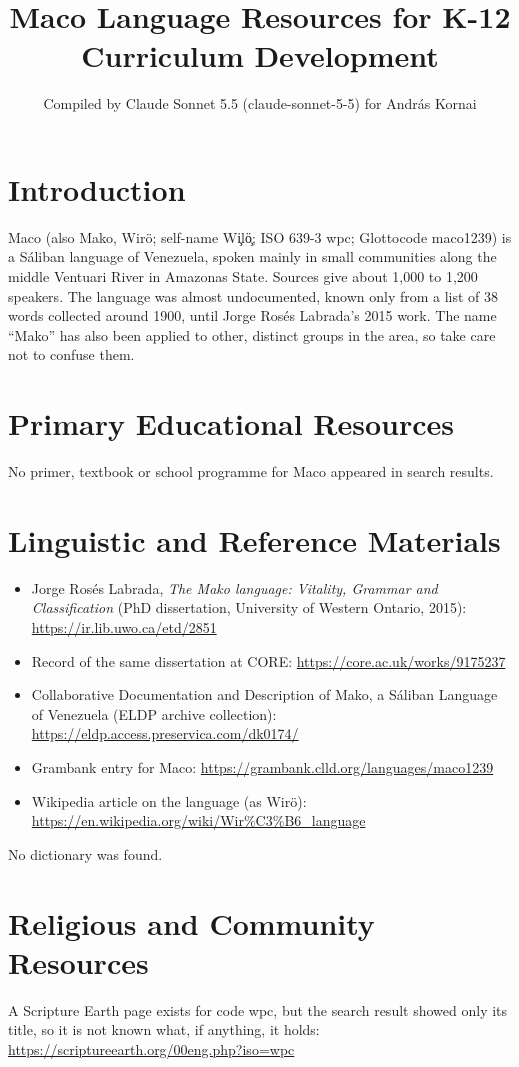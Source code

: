 \documentclass[12pt]{article}
\title{Maco Language Resources for K-12 Curriculum Development}
\author{Compiled by Claude Sonnet 5.5 (claude-sonnet-5-5) for Andr\'as Kornai}
\date{}
\begin{document}
\maketitle

\section{Introduction}
Maco (also Mako, Wir\"o; self-name Wi\c{}l\"o\c{}; ISO 639-3 wpc; Glottocode maco1239) is a S\'aliban language of Venezuela, spoken mainly in small communities along the middle Ventuari River in Amazonas State. Sources give about 1,000 to 1,200 speakers. The language was almost undocumented, known only from a list of 38 words collected around 1900, until Jorge Ros\'es Labrada's 2015 work. The name ``Mako'' has also been applied to other, distinct groups in the area, so take care not to confuse them.

\section{Primary Educational Resources}
No primer, textbook or school programme for Maco appeared in search results.

\section{Linguistic and Reference Materials}
\begin{itemize}
\item Jorge Ros\'es Labrada, \emph{The Mako language: Vitality, Grammar and Classification} (PhD dissertation, University of Western Ontario, 2015): \url{https://ir.lib.uwo.ca/etd/2851}
\item Record of the same dissertation at CORE: \url{https://core.ac.uk/works/9175237}
\item Collaborative Documentation and Description of Mako, a S\'aliban Language of Venezuela (ELDP archive collection): \url{https://eldp.access.preservica.com/dk0174/}
\item Grambank entry for Maco: \url{https://grambank.clld.org/languages/maco1239}
\item Wikipedia article on the language (as Wir\"o): \url{https://en.wikipedia.org/wiki/Wir%C3%B6_language}
\end{itemize}
No dictionary was found.

\section{Religious and Community Resources}
A Scripture Earth page exists for code wpc, but the search result showed only its title, so it is not known what, if anything, it holds: \url{https://scriptureearth.org/00eng.php?iso=wpc}
\end{document}
